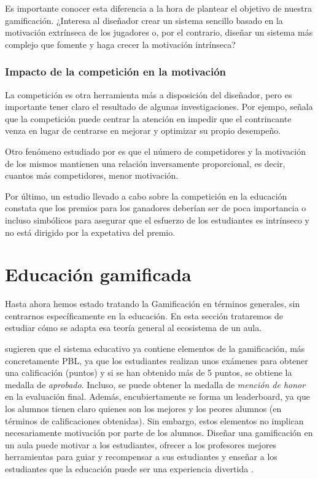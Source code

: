 Es importante conocer esta diferencia a la hora de plantear el objetivo de nuestra gamificación. 
%
¿Interesa al diseñador crear un sistema sencillo basado en la motivación extrínseca de los jugadores o, por el contrario, diseñar un sistema más complejo que fomente y haga crecer la motivación intrínseca?



\subsubsection{Impacto de la competición en la motivación}

\label{PosiblesPeligros}
%
La competición es otra herramienta más a disposición del diseñador, pero es importante tener claro el resultado de algunas investigaciones.
%
Por ejempo, \cite{Crawford_CompetitionDef} señala que la competición puede centrar la atención en impedir que el contrincante venza en lugar de centrarse en mejorar y optimizar su propio desempeño.

Otro fenómeno estudiado por \cite{n-effect} es que el número de competidores y la motivación de los mismos mantienen una relación inversamente proporcional, es decir, cuantos más competidores, menor motivación.

Por último, un estudio llevado a cabo sobre la competición en la educación \cite{CompetitionInEd} constata que los premios para los ganadores deberían ser de poca importancia o incluso simbólicos para asegurar que el esfuerzo de los estudiantes es intrínseco y no está dirigido por la expetativa del premio.


\section{Educación gamificada}

Hasta ahora hemos estado tratando la Gamificación en términos generales, sin centrarnos específicamente en la educación. 
%
En esta sección trataremos de estudiar cómo se adapta esa teoría general al ecosistema de un aula.


\cite{lee2011gamification} sugieren que el sistema educativo ya contiene elementos de la gamificación, más concretamente \gls{PBL}, ya que los estudiantes realizan unos exámenes para obtener una calificación (puntos) y si se han obtenido más de 5 puntos, se obtiene la medalla de \textit{aprobado}.
%
Incluso, se puede obtener la medalla de \textit{mención de honor} en la evaluación final.
%
Además, encubiertamente se forma un leaderboard, ya que los alumnos tienen claro quienes son los mejores y los peores alumnos (en términos de calificaciones obtenidas).
%
Sin embargo, estos elementos no implican necesariamente motivación por parte de los alumnos.
%
Diseñar una gamificación en un aula puede motivar a los estudiantes, ofrecer a los profesores mejores herramientas para guiar y recompensar a sus estudiantes y enseñar a los estudiantes que la educación puede ser una experiencia divertida \cite{lee2011gamification}.

